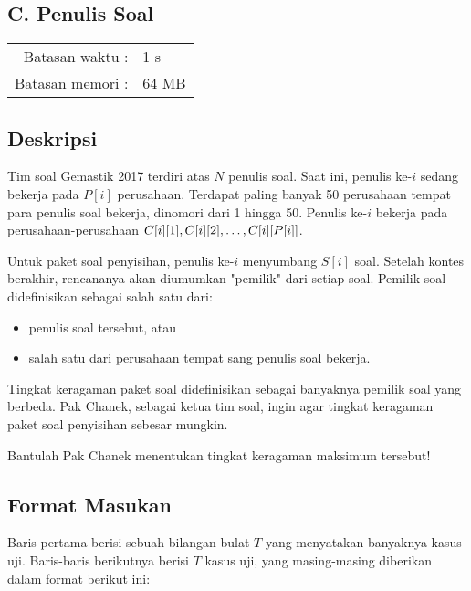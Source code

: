 \documentclass[../main_problemset.tex]{subfiles} %
\newcommand{\problemName}{C. Penulis Soal}
\newcommand{\problemTL}{1 s}
\newcommand{\problemML}{64 MB}
\begin{document}
\begin{center}
    \section*{\problemName}
    \addcontentsline{toc}{section}{\problemName} %
    
    \begin{tabular}{rl}
    Batasan waktu : & \problemTL \\
    Batasan memori : & \problemML
    \end{tabular}
\end{center}

\subsection*{Deskripsi}

Tim soal Gemastik 2017 terdiri atas $ N $ penulis soal. Saat ini, penulis ke-$ i $ sedang bekerja pada $ P[i] $ perusahaan. Terdapat paling banyak 50 perusahaan tempat para penulis soal bekerja, dinomori dari 1 hingga 50. Penulis ke-$ i $ bekerja pada perusahaan-perusahaan $ C[i][1], C[i][2], \mathellipsis, C[i][P[i]] $.

Untuk paket soal penyisihan, penulis ke-$ i $ menyumbang $ S[i] $ soal. Setelah kontes berakhir, rencananya akan diumumkan "pemilik" dari setiap soal. Pemilik soal didefinisikan sebagai salah satu dari:

\begin{itemize}
	\item penulis soal tersebut, atau
	\item salah satu dari perusahaan tempat sang penulis soal bekerja.
\end{itemize}

Tingkat keragaman paket soal didefinisikan sebagai banyaknya pemilik soal yang berbeda. Pak Chanek, sebagai ketua tim soal, ingin agar tingkat keragaman paket soal penyisihan sebesar mungkin.

Bantulah Pak Chanek menentukan tingkat keragaman maksimum tersebut!

\subsection*{Format Masukan}

Baris pertama berisi sebuah bilangan bulat $ T $ yang menyatakan banyaknya kasus uji. Baris-baris berikutnya berisi $ T $ kasus uji, yang masing-masing diberikan dalam format berikut ini:
\end{document}
